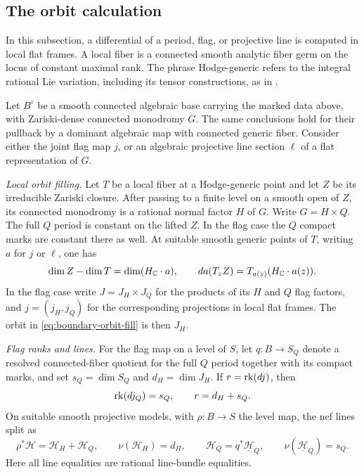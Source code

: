 \subsection{The orbit calculation}

In this subsection, a differential of a period, flag, or projective
line is computed in local flat frames.  A local fiber is a connected
smooth analytic fiber germ on the locus of constant maximal rank.
The phrase Hodge-generic refers to the integral rational Lie variation,
including its tensor constructions, as in .

\begin{lemma}\label{lem:orbit-rank}
Let $B^\circ$ be a smooth connected algebraic base carrying the marked
data above, with Zariski-dense connected monodromy $G$.  The same
conclusions hold for their pullback by a dominant algebraic map with
connected generic fiber.  Consider either the joint flag map $j$, or
an algebraic projective line section $\ell$ of a flat representation
of $G$.

\emph{Local orbit filling.}
Let $T$ be a local fiber at a Hodge-generic point and let $Z$ be its
irreducible Zariski closure.  After passing to a finite level on a
smooth open of $Z$, its connected monodromy is a rational normal
factor $H$ of $G$.  Write $G=H\times Q$.  The full $Q$ period is
constant on the lifted $Z$.  In the flag case the $Q$ compact marks
are constant there as well.  At suitable smooth generic points of
$T$, writing $a$ for $j$ or $\ell$, one has
\begin{equation}\label{eq:boundary-orbit-fill}
 \dim Z-\dim T=\dim(H_{\mathbb C}\cdot a),\qquad
 da(T_zZ)=T_{a(z)}(H_{\mathbb C}\cdot a(z)).
\end{equation}
In the flag case write $J=J_H\times J_Q$ for the products of its $H$
and $Q$ flag factors, and $j=(j_H,j_Q)$ for the corresponding
projections in local flat frames.  The orbit in
\eqref{eq:boundary-orbit-fill} is then $J_H$.

\emph{Flag ranks and lines.}
For the flag map on a level of $S$, let $q:B\to S_Q$ denote a resolved
connected-fiber quotient for the full $Q$ period together with its
compact marks, and set $s_Q=\dim S_Q$ and $d_H=\dim J_H$.  If
$r=\operatorname{rk}(dj)$, then
\begin{equation}\label{eq:boundary-rank-split}
 \operatorname{rk}(dj_Q)=s_Q,\qquad r=d_H+s_Q.
\end{equation}
On suitable smooth projective models, with $\rho:B\to S$ the level
map, the nef lines split as
\begin{equation}\label{eq:boundary-line-split}
 \rho^*\mathcal H=\mathcal H_H+\mathcal H_Q,
 \qquad \nu(\mathcal H_H)=d_H,
 \qquad \mathcal H_Q=q^*\underline{\mathcal H}_Q,
 \qquad \nu(\underline{\mathcal H}_Q)=s_Q.
\end{equation}
Here all line equalities are rational line-bundle equalities.
\end{lemma}

